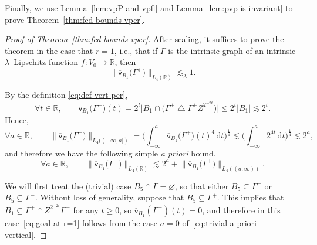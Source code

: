 \documentclass[11pt,reqno]{amsart}
\newcommand{\R}{\mathbb{R}}
\newcommand{\ud}[0]{\,\mathrm{d}}
\newcommand{\0}{\mathbf{0}}
\renewcommand{\1}{\mathbf 1}
\newcommand{\from}{\colon}
\newcommand{\symdiff}{\mathbin{\triangle}}
\renewcommand{\subset}{\subseteq}
\renewcommand{\ge}{\geqslant}
\renewcommand{\le}{\leqslant}
\renewcommand{\emptyset}{\varnothing}
\theoremstyle{remark}
\newcommand{\vpfl}[1]{{\overline{\mathsf{v}}_{\!#1}}}
\begin{document}
Finally, we use Lemma~\ref{lem:vpP and vpfl} and Lemma~\ref{lem:pvp is invariant} to prove Theorem~\ref{thm:fcd bounds vper}.

\begin{proof}[{Proof of Theorem~\ref{thm:fcd bounds vper}}]
    After scaling, it suffices to prove the theorem in the case that $r=1$, i.e., that if $\Gamma$ is the intrinsic graph of an intrinsic $\lambda$--Lipschitz function $f\from V_0\to \R$, then
  \begin{equation}\label{eq:goal at r=1}
    \big\|\vpfl{B_1}\big(\Gamma^+\big)\big\|_{L_4(\R)}\lesssim_{\lambda} 1.
    \end{equation}

By the definition \eqref{eq:def vert per},
 $$
\forall t\in \R,\qquad  \vpfl{B_1}\big(\Gamma^+\big)(t)=2^t \big|B_1\cap \big(\Gamma^+\symdiff \Gamma^+Z^{2^{-2t}}\big)\big|\le 2^t |B_1|\lesssim 2^t.
 $$
 Hence,
\begin{equation*}
\forall  a\in \R,\qquad  \big\|\vpfl{B_1}\big(\Gamma^+\big)\big\|_{L_4((-\infty,a])}=\bigg(\int_{-\infty}^a  \vpfl{B_1}\big(\Gamma^+\big)(t)^4\ud t\bigg)^{\frac14}\lesssim \bigg(\int_{-\infty}^a2^{4t}\ud t\bigg)^{\frac14}\lesssim 2^{a},
\end{equation*}
 and therefore  we have the following simple \emph{a priori} bound.
 \begin{equation}\label{eq:trivial a priori vertical}
\forall  a\in \R,\qquad  \big\|\vpfl{B_1}\big(\Gamma^+\big)\big\|_{L_4(\R)}\lesssim 2^a+\big\|\vpfl{B_1}\big(\Gamma^+\big)\big\|_{L_4((a,\infty))}.
 \end{equation}

We will first treat the (trivial) case  $B_5\cap \Gamma=\emptyset$, so that either $B_5\subset \Gamma^+$ or $B_5\subset \Gamma^-$. Without loss of generality, suppose that  $B_5\subset \Gamma^+$. This implies that $B_1\subset \Gamma^+ \cap Z^{2^{-2t}}\Gamma^+$ for any $t\ge 0$, so $\vpfl{B_1}(\Gamma^+)(t)=0$, and therefore in this case~\eqref{eq:goal at r=1} follows from the case $a=0$ of~\eqref{eq:trivial a priori vertical}.




\end{proof}
\end{document}
